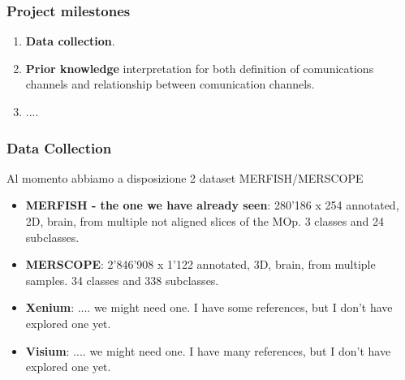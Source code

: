 \documentclass[10pt]{beamer}
\begin{document}
\begin{frame}
    \frametitle{Project milestones}
    \begin{enumerate}
        \item \textbf{Data collection}.
        \item \textbf{Prior knowledge} interpretation for both definition of comunications channels and relationship between comunication channels.
        \item ....
    \end{enumerate}
\end{frame}

\begin{frame}
    \frametitle{Data Collection}
    Al momento abbiamo a disposizione 2 dataset MERFISH/MERSCOPE
    \begin{itemize}
        \item \textbf{MERFISH - the one we have already seen}: 280'186 x 254 annotated, 2D, brain, from multiple not aligned slices of the MOp. 3 classes and 24 subclasses.
        \item \textbf{MERSCOPE}: 2'846'908 x 1'122 annotated, 3D, brain, from multiple samples. 34 classes and 338 subclasses.
        \item \textbf{Xenium}: .... we might need one. I have some references, but I don't have explored one yet.
        \item \textbf{Visium}: .... we might need one. I have many references, but I don't have explored one yet.
    \end{itemize}
\end{frame}
\end{document}
